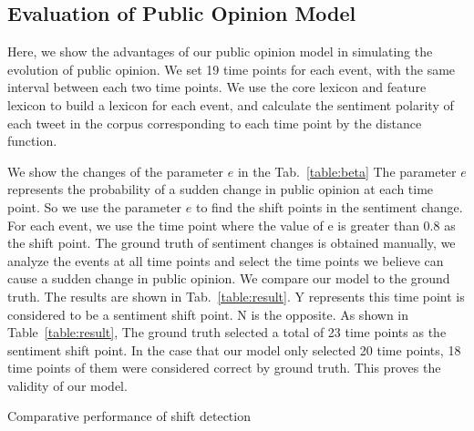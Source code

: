 \documentclass[runningheads]{llncs}
\begin{document}
\subsection{Evaluation of Public Opinion Model}
Here, we show the advantages of our public opinion model in simulating the evolution of public opinion. We set 19 time points for each event, with the same interval between each two time points. We use the core lexicon and feature lexicon to build a lexicon for each event, and calculate the sentiment polarity of each tweet in the corpus corresponding to each time point by the distance function.




We show the changes of the parameter $e$ in the Tab.~\ref{table:beta} The parameter $e$ represents the probability of a sudden change in public opinion at each time point. So we use the parameter $e$ to find the shift points in the sentiment change. For each event, we use the time point where the value of e is greater than 0.8 as the shift point. The ground truth of sentiment changes is obtained manually, we analyze the events at all time points and select the time points we believe can cause a sudden change in public opinion. We compare our model to the ground truth. The results are shown in Tab.~\ref{table:result}. Y represents this time point is considered to be a sentiment shift point. N is the opposite. As shown in Table~\ref{table:result}, The ground truth selected a total of 23 time points as the sentiment shift point. In the case that our model only selected 20 time points, 18 time points of them were considered correct by ground truth. This proves the validity of our model.
\begin{table}[ht]
\caption{Comparative performance of shift detection}\label{table:result}
\begin{center}

\end{center}
\end{table}
\end{document}
